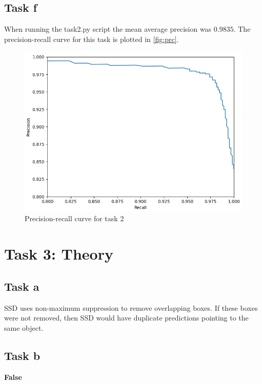 \documentclass{article}
\begin{document}
\subsection{Task f}
When running the task2.py script the mean average precision was $0.9835$.
The precision-recall curve for this task is plotted in \autoref{fig:prc}.
\begin{figure}[H]
    \centering
    \includegraphics[width=\textwidth]{Assignments/Assignment_4/plots/precision_recall_curve.png}
    \caption{Precision-recall curve for task 2}
    \label{fig:prc}
\end{figure}

\section{Task 3: Theory}

\subsection{Task a}
 

SSD uses non-maximum suppression to remove overlapping boxes. If these boxes were not removed, then SSD would have duplicate predictions pointing to the same object.

\subsection{Task b}
\textbf{False}
\end{document}
